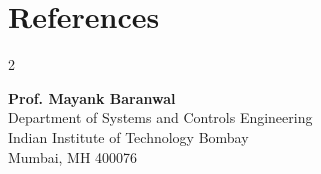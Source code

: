 \documentclass[letterpaper,11pt]{article}
\makeatletter
\newcommand{\resumeSubHeadingListStart}{\begin{itemize}[leftmargin=0.15in, label={}]}
\newcommand{\resumeSubHeadingListEnd}{\end{itemize}}
\newcommand{\resumeOrganizationHeading}[4]{
  \vspace{-2pt}\item
    \begin{tabular*}{0.97\textwidth}[t]{l@{\extracolsep{\fill}}r}
      \textbf{#1} & \textit{\small #2} \\
      \textit{\small#3}
    \end{tabular*}\vspace{-7pt}
}
\newcommand{\resumeSubHeadingListStart}{\begin{itemize}[leftmargin=0.15in, label={}]}
\newcommand{\resumeSubHeadingListEnd}{\end{itemize}}
\makeatother
\begin{document}
{{{%

    
    




    
    








\section{References}
\vspace{2pt}

\begin{multicols}{2} %
\raggedright %

\parbox{\linewidth}{
    \textbf{Prof. Mayank Baranwal} \\
    Department of Systems and Controls Engineering \\
    Indian Institute of Technology Bombay \\
    Mumbai, MH 400076 \\
    \href{mailto:mbaranwal@iitb.ac.in}{\textcolor{blue}\faEnvelope {}}
}


\end{multicols}}}}
\end{document}
